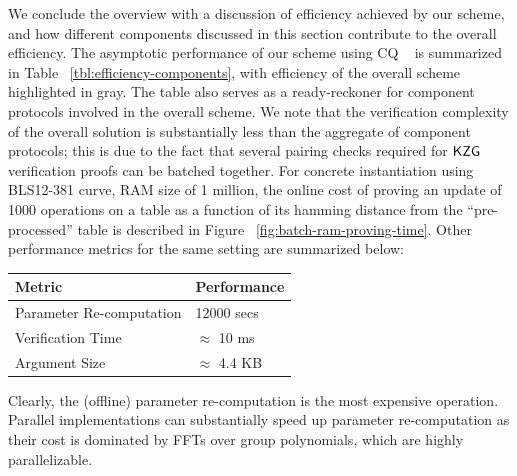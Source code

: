  We conclude the overview with a discussion of efficiency achieved by our scheme, and
how different components discussed in this section contribute to the overall efficiency. The asymptotic performance
of our scheme using CQ ~\cite{EPRINT:EagFioGab22} is summarized in Table ~\ref{tbl:efficiency-components}, with
efficiency of the overall scheme highlighted in gray. The table also serves as a ready-reckoner for component protocols
involved in the overall scheme. We note that the verification complexity of the overall solution is substantially
less than the aggregate of component protocols; this is due to the fact that several pairing checks required for
$\mathsf{KZG}$ verification proofs can be batched together. For concrete instantiation using BLS12-381 curve, RAM size
of 1 million, the online cost of proving an update of 1000 operations on a table as a function of its
hamming distance from the ``pre-processed'' table is described in Figure ~\ref{fig:batch-ram-proving-time}.
Other performance metrics for the same setting are summarized below:
\begin{table}[htbp]
\begin{tabularx}{0.45\textwidth}{|X|X|}
\hline
{\bf Metric} & {\bf Performance} \\ \hline
Parameter Re-computation & 12000 secs \\ \hline
Verification Time & $\approx$ 10 ms \\ \hline
Argument Size & $\approx$ 4.4 KB \\
\hline
\end{tabularx}
\end{table}

Clearly, the (offline) parameter re-computation is the most expensive operation. Parallel implementations can
substantially speed up parameter re-computation as their cost is dominated by FFTs over group polynomials, which
are highly parallelizable.

\smallskip


